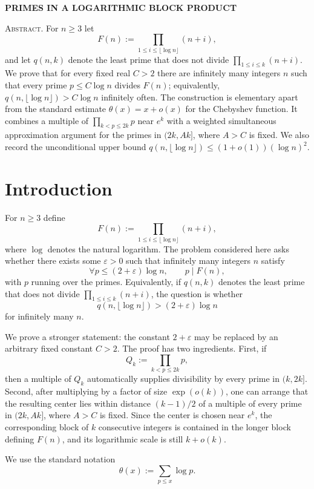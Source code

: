 \documentclass[11pt]{article}
\begin{document}
\begin{center}
{\Large\bfseries PRIMES IN A LOGARITHMIC BLOCK PRODUCT}
\end{center}

\medskip

\noindent\textsc{Abstract.} For $n \ge 3$ let
\[
F(n):=\prod_{1\le i\le \lfloor \log n\rfloor}(n+i),
\]
and let $q(n,k)$ denote the least prime that does not divide $\prod_{1\le i\le k}(n+i)$. We prove that for every fixed real $C>2$ there are infinitely many integers $n$ such that every prime $p\le C\log n$ divides $F(n)$; equivalently, $q(n,\lfloor \log n\rfloor)>C\log n$ infinitely often. The construction is elementary apart from the standard estimate $\theta(x)=x+o(x)$ for the Chebyshev function. It combines a multiple of $\prod_{k<p\le 2k}p$ near $e^k$ with a weighted simultaneous approximation argument for the primes in $(2k,Ak]$, where $A>C$ is fixed. We also record the unconditional upper bound $q(n,\lfloor \log n\rfloor)\le (1+o(1))(\log n)^2$.

\section{Introduction}

For $n\ge 3$ define
\[
F(n):=\prod_{1\le i\le \lfloor \log n\rfloor}(n+i),
\]
where $\log$ denotes the natural logarithm. The problem considered here asks whether there exists some $\varepsilon>0$ such that infinitely many integers $n$ satisfy
\[
\forall p\le (2+\varepsilon)\log n,\qquad p\mid F(n),
\]
with $p$ running over the primes. Equivalently, if $q(n,k)$ denotes the least prime that does not divide $\prod_{1\le i\le k}(n+i)$, the question is whether
\[
q(n,\lfloor \log n\rfloor)>(2+\varepsilon)\log n
\]
for infinitely many $n$.

We prove a stronger statement: the constant $2+\varepsilon$ may be replaced by an arbitrary fixed constant $C>2$. The proof has two ingredients. First, if
\[
Q_k:=\prod_{k<p\le 2k}p,
\]
then a multiple of $Q_k$ automatically supplies divisibility by every prime in $(k,2k]$. Second, after multiplying by a factor of size $\exp(o(k))$, one can arrange that the resulting center lies within distance $(k-1)/2$ of a multiple of every prime in $(2k,Ak]$, where $A>C$ is fixed. Since the center is chosen near $e^k$, the corresponding block of $k$ consecutive integers is contained in the longer block defining $F(n)$, and its logarithmic scale is still $k+o(k)$.

We use the standard notation
\[
\theta(x):=\sum_{p\le x}\log p.
\]
\end{document}
